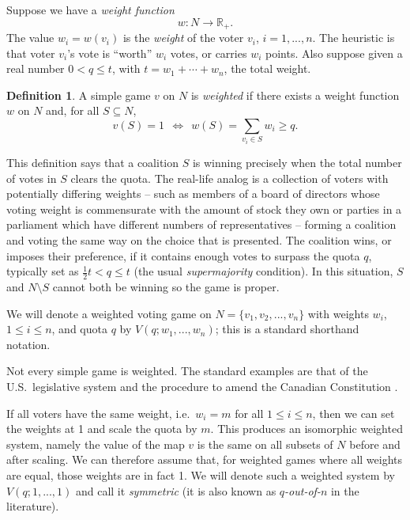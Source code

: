 \documentclass[11pt]{amsart}
\newcommand{\R}{{\mathbb R}}
\theoremstyle{plain}
\theoremstyle{definition}
\newtheorem{defin}[thm]{Definition}
\theoremstyle{remark}
\begin{document}
Suppose we have a \emph{weight function}
$$
w\colon N \longrightarrow \R_+.
$$
The value $w_i=w(v_i)$ is the \emph{weight} of the voter $v_i$, $i=1,...,n$. The heuristic is that voter $v_i$'s vote is ``worth'' $w_i$ votes, or carries $w_i$ points. Also suppose given a real number $0<q\leq t$, with $t=w_1+\cdots+w_n$, the total weight.

\begin{defin}\label{D:WeightedGame}
A simple game $v$ on $N$ is \emph{weighted} if there exists a weight function $w$ on $N$ and, for all $S\subseteq N$, 
$$
v(S)=1\ \  \Longleftrightarrow\ \  w(S)=\sum_{v_i\in S} w_i \geq q.
$$

\end{defin}

This definition says that a coalition $S$ is winning precisely when the total number of votes in $S$ clears the quota. The real-life analog is a collection of voters with potentially differing weights -- such as members of a board of directors whose voting weight is commensurate with the amount of stock they own or parties in a parliament which have different numbers of representatives -- forming a coalition and voting the same way on the choice that is presented. The coalition wins, or imposes their preference, if it contains enough votes to surpass the quota $q$, typically set as $\frac{1}{2}t<q \leq t$ (the usual \emph{supermajority} condition). In this situation, $S$ and $N\setminus S$ cannot both be winning so the game is proper.


We will denote a weighted voting game on $N=\{v_1, v_2, ..., v_n\}$ with weights $w_i$, $1\leq i \leq n$, and quota $q$ by $V(q; w_1,...,w_n)$; this is a standard shorthand notation.


Not every simple game is weighted. The standard examples are that of the U.S.~legislative system and the procedure to amend the Canadian Constitution \cite{J:GameCategory, TZ:SimpleGames}.

If all voters have the same weight, i.e.~$w_i=m$ for all $1\leq i\leq n$, then we can set the weights at 1 and scale the quota by $m$. This produces an isomorphic weighted system, namely the value of the map $v$ is the same on all subsets of $N$ before and after scaling. We can therefore assume that, for weighted games where 
all weights are equal, those weights are in fact 1. We will denote such a weighted system by $V(q; 1,...,1)$ and call it \emph{symmetric} (it is also known as \emph{$q$-out-of-$n$} in the literature).
\end{document}
